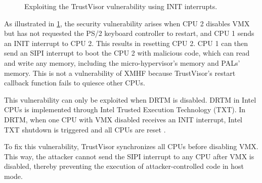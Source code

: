 \begin{figure}[tbp]
	\begin{center}
	
	\end{center}
	\caption{Exploiting the TrustVisor vulnerability using INIT interrupts.}
	\label{fig:vuln_init_exploit}
\end{figure}

As illustrated in \ref{fig:vuln_init_exploit}, the security vulnerability arises when CPU 2 disables VMX but has not requested the PS/2 keyboard controller to restart, and CPU 1 sends an INIT interrupt to CPU 2. This results in resetting CPU 2. CPU 1 can then send an SIPI interrupt to boot the CPU 2 with malicious code, which can read and write any memory, including the micro-hypervisor's memory and PALs' memory. This is not a vulnerability of XMHF because TrustVisor's restart callback function fails to quiesce other CPUs.

This vulnerability can only be exploited when DRTM is disabled. DRTM in Intel CPUs is implemented through Intel Trusted Execution Technology (TXT). In DRTM, when one CPU with VMX disabled receives an INIT interrupt, Intel TXT shutdown is triggered and all CPUs are reset \cite{intel_txt}.

To fix this vulnerability, TrustVisor synchronizes all CPUs before disabling VMX. This way, the attacker cannot send the SIPI interrupt to any CPU after VMX is disabled, thereby preventing the execution of attacker-controlled code in host mode.

